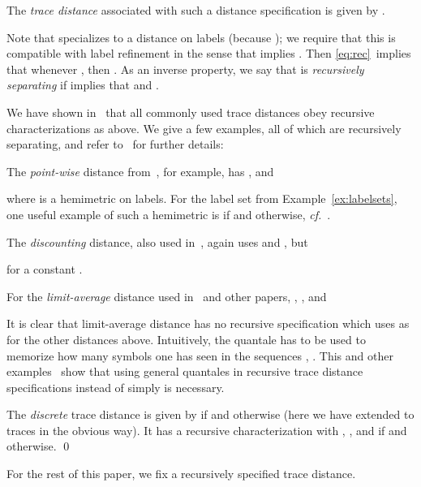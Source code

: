 \documentclass[twocolumn]{svjour3-dummy}
\newcommand*\cf{\textit{cf.}\xspace}
\begin{document}
The \emph{trace distance} associated with such a distance specification
is  given by .

Note that  specializes to a distance on labels (because
); we require that this is compatible
with label refinement in the sense that  implies .  Then \eqref{eq:rec}~implies that whenever ,
then .  As an inverse
property, we say that  is \emph{recursively separating} if  implies that  and .

\begin{example}
  \label{ex:distances}
  We have shown in~\cite{DBLP:conf/fsttcs/FahrenbergLT11, DBLP:conf/csr/BauerFLT12,
    DBLP:conf/aplas/FahrenbergL13, DBLP:journals/tcs/FahrenbergL14,
    DBLP:journals/acta/FahrenbergL14} that all commonly used trace
  distances obey recursive characterizations as above.  We give a few
  examples, all of which are recursively separating, and refer
  to~\cite{DBLP:journals/tcs/FahrenbergL14,
    DBLP:journals/acta/FahrenbergL14} for further details:

  The \emph{point-wise} distance
  from~\cite{DBLP:journals/tcs/AlfaroFHMS05}, for example, has ,  and
  
  where  is a
  hemimetric on labels.  For the label set  from
  Example~\ref{ex:labelsets}, one useful example of such a hemimetric is
   if
   and  otherwise,
  \cf~\cite{DBLP:journals/fmsd/BauerFJLLT13}.

  The \emph{discounting} distance, also used
  in~\cite{DBLP:journals/tcs/AlfaroFHMS05}, again uses  and , but
  
  for a constant .

  For the \emph{limit-average} distance used
  in~\cite{DBLP:journals/tcs/CernyHR12} and other papers, , , and
  
  It is clear that limit-average distance has no recursive
  specification which uses  as for the
  other distances above.  Intuitively, the quantale  has to be used to memorize how many symbols one has
  seen in the sequences , .  This and other
  examples~\cite{DBLP:journals/tcs/FahrenbergL14,
    DBLP:journals/acta/FahrenbergL14} show that using general
  quantales in recursive trace distance specifications instead of
  simply  is necessary.

  The \emph{discrete} trace distance is given by 
  if  and  otherwise (here we have extended
   to traces in the obvious way).  It has a recursive
  characterization with , , and
   if  and
   otherwise. \qed
\end{example}

For the rest of this paper, we fix a recursively specified trace
distance.
\end{document}
